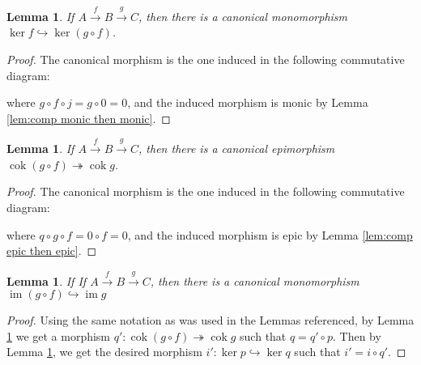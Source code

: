 \documentclass{article}
\DeclareMathOperator{\im}{\mathrm{im}}
\DeclareMathOperator{\cok}{\mathrm{cok}}
\newtheorem{lemma}[theorem]{Lemma}
\begin{document}
\begin{lemma}\label{lem:ker of comp into ker of first}
    If $A\xrightarrow{f}B\xrightarrow{g}C$, then there is a canonical monomorphism $\ker f\hookrightarrow \ker (g\circ f)$.
\end{lemma}
\begin{proof}
    The canonical morphism is the one induced in the following commutative diagram:
    \begin{center}
    \end{center}
    where $g\circ f\circ j=g\circ 0=0$, and the induced morphism is monic by Lemma \ref{lem:comp monic then monic}.
\end{proof}
\begin{lemma}\label{lem:cok of comp onto cok of second}
    If $A\xrightarrow{f}B\xrightarrow{g}C$, then there is a canonical epimorphism $\cok (g\circ f) \twoheadrightarrow \cok g$.
\end{lemma}
\begin{proof}
    The canonical morphism is the one induced in the following commutative diagram:
    \begin{center}
    \end{center}
    where $q\circ g\circ f=0\circ f=0$, and the induced morphism is epic by Lemma \ref{lem:comp epic then epic}.
\end{proof}
\begin{lemma}\label{lem:im of comp into im of second}
    If If $A\xrightarrow{f}B\xrightarrow{g}C$, then there is a canonical monomorphism $\im (g\circ f) \hookrightarrow \im g$
\end{lemma}
\begin{proof}
    Using the same notation as was used in the Lemmas referenced, by Lemma \ref{lem:cok of comp onto cok of second} we get a morphism $q':\cok(g\circ f)\twoheadrightarrow \cok g$ such that $q=q'\circ p$. Then by Lemma \ref{lem:ker of comp into ker of first}, we get the desired morphism $i':\ker p\hookrightarrow \ker q$ such that $i'=i\circ q'$.
\end{proof}
\end{document}
